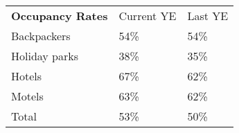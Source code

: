 \begin{tabular}[t]{p{5cm}p{1.3cm}p{1.2cm}}
 \textbf{Occupancy Rates} & Current YE & Last YE \\ 
 Backpackers & 54\% & 54\% \\ 
  Holiday parks & 38\% & 35\% \\ 
  Hotels & 67\% & 62\% \\ 
  Motels & 63\% & 62\% \\ 
  Total & 53\% & 50\% \\ 
  \end{tabular}
